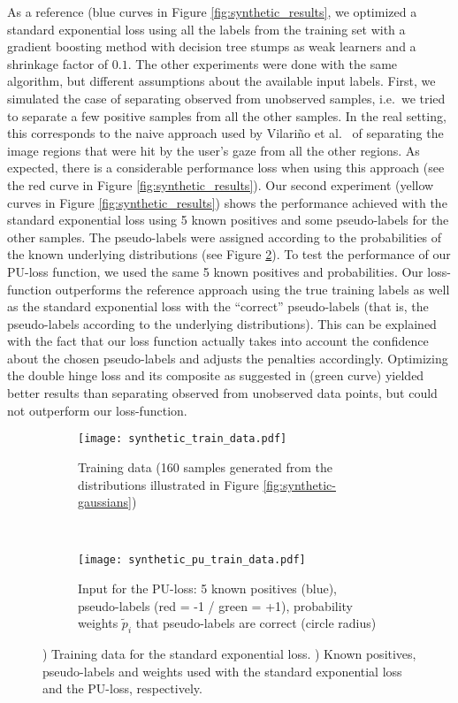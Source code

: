 As a reference (blue curves in Figure \ref{fig:synthetic_results}, we optimized a standard exponential loss using all the labels from the training set with a gradient boosting method with decision tree stumps as weak learners and a shrinkage factor of $0.1.$ 
The other experiments were done with the same algorithm, but different assumptions about the available input labels. 
First, we simulated the case of separating observed from unobserved samples, i.e.\ we tried to separate a few positive samples from all the other samples. 
In the real setting, this corresponds to the naive approach used by Vilari\~no et al.\ \cite{vilarino2007automatic} of separating the image regions that were hit by the user's gaze from all the other regions. 
As expected, there is a considerable performance loss when using this approach (see the red curve in Figure \ref{fig:synthetic_results}). 
Our second experiment (yellow curves in Figure \ref{fig:synthetic_results}) shows the performance achieved with the standard exponential loss using 5 known positives and some pseudo-labels for the other samples. 
The pseudo-labels were assigned according to the probabilities of the known underlying distributions (see Figure \ref{subfig:pu_train}). 
To test the performance of our PU-loss function, we used the same 5 known positives and probabilities. 
Our loss-function outperforms the reference approach using the true training labels as well as the standard exponential loss with the ``correct'' pseudo-labels (that is, the pseudo-labels according to the underlying distributions). 
This can be explained with the fact that our loss function actually takes into account the confidence about the chosen pseudo-labels and adjusts the penalties accordingly. 
Optimizing the double hinge loss and its composite as suggested in \cite{plessis2015convex} (green curve) yielded better results than separating observed from unobserved data points, but could not outperform our loss-function. 

\begin{figure}[ht]
	\centering
	\begin{subfigure}[h]{0.49\textwidth}
	\texttt{[image: synthetic\_train\_data.pdf]}	
		\caption{Training data (160 samples generated from the distributions illustrated in Figure \ref{fig:synthetic-gaussians})\newline}
		\label{subfig:ref_train}
	\end{subfigure}
	~
	\begin{subfigure}[h]{0.49\textwidth}
	\texttt{[image: synthetic\_pu\_train\_data.pdf]}	
		\caption{Input for the PU-loss: 5 known positives (blue), pseudo-labels (red = -1 / green = +1), probability weights $\tilde p_i$ that pseudo-labels are correct (circle radius)}
		\label{subfig:pu_train}
	\end{subfigure}
	\caption{) Training data for the standard exponential loss. ) Known positives, pseudo-labels and weights used with the standard exponential loss and the PU-loss, respectively.}
	\label{fig:synthetic_train_data}
\end{figure}

